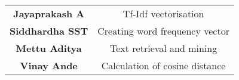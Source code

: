 \begin{center}
	\begin{tabular}{ c c  }
		\textbf{Jayaprakash A} &  Tf-Idf vectorisation  \\ 
		\textbf{Siddhardha SST} & Creating word frequency vector\\  
		\textbf{Mettu Aditya} &  Text retrieval and mining\\
		 \textbf{Vinay Ande} &   Calculation of cosine distance\\
	\end{tabular}
\end{center}


